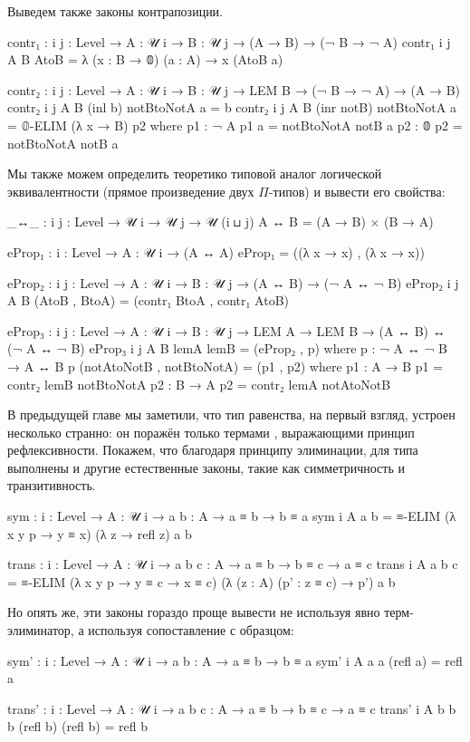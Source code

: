 \documentclass{article}[12pt]
\begin{document}
Выведем также законы контрапозиции.
\begin{code}
contr₁ : {i j : Level} → {A : 𝒰 i} → {B : 𝒰 j}
         → (A → B) → (¬ B → ¬ A)
contr₁ {i} {j} {A} {B} AtoB = λ (x : B → 𝟘) (a : A) → x (AtoB a)

contr₂ : {i j : Level} → {A : 𝒰 i} → {B : 𝒰 j}
         → LEM B
         → (¬ B → ¬ A) → (A → B)
contr₂ {i} {j} {A} {B} (inl b) notBtoNotA a = b
contr₂ {i} {j} {A} {B} (inr notB) notBtoNotA a = 𝟘-ELIM (λ x → B) p2
    where
        p1 : ¬ A
        p1 a = notBtoNotA notB a
        p2 : 𝟘
        p2 = notBtoNotA notB a
\end{code}

Мы также можем определить теоретико типовой аналог логической эквивалентности
(прямое произведение двух $\Pi$-типов) и вывести его свойства:
\begin{code}
_↔_ : {i j : Level} → 𝒰 i → 𝒰 j → 𝒰 (i ⊔ j)
A ↔ B = (A → B) × (B → A)

eProp₁ : {i : Level} → {A : 𝒰 i} → (A ↔ A)
eProp₁ = ((λ x → x) , (λ x → x))

eProp₂ : {i j : Level} → {A : 𝒰 i} → {B : 𝒰 j}
         → (A ↔ B) → (¬ A ↔ ¬ B)
eProp₂ {i} {j} {A} {B} (AtoB , BtoA) = (contr₁ BtoA , contr₁ AtoB)

eProp₃ : {i j : Level} → {A : 𝒰 i} → {B : 𝒰 j}
         → LEM A → LEM B
         → (A ↔ B) ↔ (¬ A ↔ ¬ B)
eProp₃ {i} {j} {A} {B} lemA lemB = (eProp₂ , p)
    where
        p : ¬ A ↔ ¬ B → A ↔ B
        p (notAtoNotB , notBtoNotA) = (p1 , p2)
            where
                p1 : A → B
                p1 = contr₂ lemB notBtoNotA
                p2 : B → A
                p2 = contr₂ lemA notAtoNotB
\end{code}

В предыдущей главе мы заметили, что тип равенства, на первый взгляд, устроен несколько странно:
он поражён только термами , выражающими принцип рефлексивности.
Покажем, что благодаря принципу элиминации, для типа  выполнены и другие
естественные законы, такие как симметричность и транзитивность.
\begin{code}
sym : {i : Level} → {A : 𝒰 i} → {a b : A} → a ≡ b → b ≡ a
sym {i} {A} {a} {b} = ≡-ELIM (λ x y p → y ≡ x) (λ z → refl z) a b

trans : {i : Level} → {A : 𝒰 i} → {a b c : A}
        → a ≡ b → b ≡ c → a ≡ c
trans {i} {A} {a} {b} {c} = ≡-ELIM (λ x y p → y ≡ c → x ≡ c) 
                                   (λ (z : A) (p' : z ≡ c) → p') a b
\end{code}
Но опять же, эти законы гораздо проще вывести не используя явно терм-элиминатор,
а используя сопоставление с образцом:
\begin{code}
sym' : {i : Level} → {A : 𝒰 i} → {a b : A} → a ≡ b → b ≡ a
sym' {i} {A} {a} {a} (refl a) = refl a

trans' : {i : Level} → {A : 𝒰 i} → {a b c : A}
        → a ≡ b → b ≡ c → a ≡ c
trans' {i} {A} {b} {b} {b} (refl b) (refl b) = refl b
\end{code}
\end{document}
